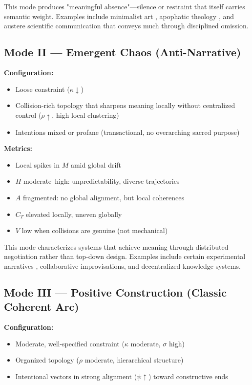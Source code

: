 \documentclass[12pt]{article}
\begin{document}
This mode produces "meaningful absence"—silence or restraint that itself carries semantic weight. Examples include minimalist art \citep{batchelor1997minimalism}, apophatic theology \citep{turner1995darkness}, and austere scientific communication that conveys much through disciplined omission.

\subsection{Mode II — Emergent Chaos (Anti-Narrative)}

\textbf{Configuration:}
\begin{itemize}
\item Loose constraint ($\kappa \downarrow$)
\item Collision-rich topology that sharpens meaning locally without centralized control ($\rho \uparrow$, high local clustering)
\item Intentions mixed or profane (transactional, no overarching sacred purpose)
\end{itemize}

\textbf{Metrics:}
\begin{itemize}
\item Local spikes in $M$ amid global drift
\item $H$ moderate–high: unpredictability, diverse trajectories
\item $A$ fragmented: no global alignment, but local coherences
\item $C_T$ elevated locally, uneven globally
\item $V$ low when collisions are genuine (not mechanical)
\end{itemize}

This mode characterizes systems that achieve meaning through distributed negotiation rather than top-down design. Examples include certain experimental narratives \citep{joyce1922ulysses}, collaborative improvisations, and decentralized knowledge systems.

\subsection{Mode III — Positive Construction (Classic Coherent Arc)}

\textbf{Configuration:}
\begin{itemize}
\item Moderate, well-specified constraint ($\kappa$ moderate, $\sigma$ high)
\item Organized topology ($\rho$ moderate, hierarchical structure)
\item Intentional vectors in strong alignment ($\psi \uparrow$) toward constructive ends
\end{itemize}
\end{document}
